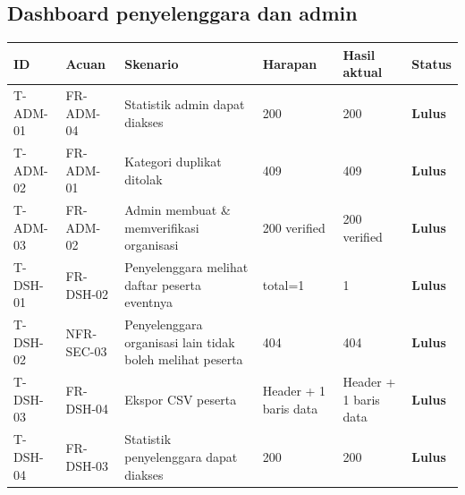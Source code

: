 \documentclass[11pt,a4paper]{article}
\renewcommand{\arraystretch}{1.2}
\begin{document}
\subsection{Dashboard penyelenggara dan admin}
{\footnotesize\setlength{\parskip}{0pt}\renewcommand{\arraystretch}{1.15}
\begin{longtable}{p{1.8cm}p{1.9cm}p{4.0cm}p{2.4cm}p{3.4cm}p{1.2cm}}
\toprule ID & Acuan & Skenario & Harapan & Hasil aktual & Status\\\midrule\endhead
\mbox{T-ADM-01} & FR-ADM-04 & Statistik admin dapat diakses & 200 & 200 & \textbf{Lulus}\\
\midrule
\mbox{T-ADM-02} & FR-ADM-01 & Kategori duplikat ditolak & 409 & 409 & \textbf{Lulus}\\
\midrule
\mbox{T-ADM-03} & FR-ADM-02 & Admin membuat \& memverifikasi organisasi & 200 verified & 200 verified & \textbf{Lulus}\\
\midrule
\mbox{T-DSH-01} & FR-DSH-02 & Penyelenggara melihat daftar peserta eventnya & total=1 & 1 & \textbf{Lulus}\\
\midrule
\mbox{T-DSH-02} & NFR-SEC-03 & Penyelenggara organisasi lain tidak boleh melihat peserta & 404 & 404 & \textbf{Lulus}\\
\midrule
\mbox{T-DSH-03} & FR-DSH-04 & Ekspor CSV peserta & Header + 1 baris data & Header + 1 baris data & \textbf{Lulus}\\
\midrule
\mbox{T-DSH-04} & FR-DSH-03 & Statistik penyelenggara dapat diakses & 200 & 200 & \textbf{Lulus}\\
\midrule
\bottomrule
\end{longtable}}
\end{document}
